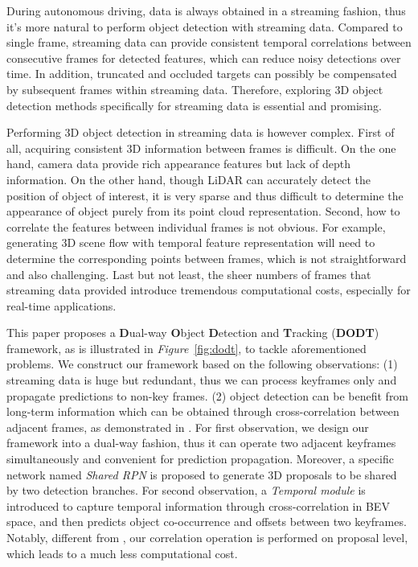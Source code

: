 \documentclass[a4paper, 10pt, conference]{ieeeconf}      %
\def\figurename{\emph{Figure}}
\begin{document}
During autonomous driving, data is always obtained in a streaming fashion, thus it's more natural to perform object detection with streaming data. Compared to single frame, streaming data can provide consistent temporal correlations between consecutive frames for detected features, which can reduce noisy detections over time. In addition, truncated and occluded targets can possibly be compensated by subsequent frames within streaming data. Therefore, exploring 3D object detection methods specifically for streaming data is essential and promising.

Performing 3D object detection in streaming data is however complex. First of all, acquiring consistent 3D information between frames is difficult. On the one hand, camera data provide rich appearance features but lack of depth information. On the other hand, though LiDAR can accurately detect the position of object of interest, it is very sparse and thus difficult to determine the appearance of object purely from its point cloud representation. Second, how to correlate the features between individual frames is not obvious. For example, generating 3D scene flow with temporal feature representation will need to determine the corresponding points between frames, which is not straightforward and also challenging. Last but not least, the sheer numbers of frames that streaming data provided introduce tremendous computational costs, especially for real-time applications. 

This paper proposes a \textbf{D}ual-way \textbf{O}bject \textbf{D}etection and \textbf{T}racking (\textbf{DODT}) framework, as is illustrated in \figurename \, \ref{fig:dodt}, to tackle aforementioned problems. We construct our framework based on the following observations: (1) streaming data is huge but redundant, thus we can process keyframes only and propagate predictions to non-key frames. (2) object detection can be benefit from long-term information which can be obtained through cross-correlation between adjacent frames, as demonstrated in \cite{feichtenhofer2017detect}. For first observation, we design our framework into a dual-way fashion, thus it can operate two adjacent keyframes simultaneously and convenient for prediction propagation. Moreover, a specific network named \textit{Shared RPN} is proposed to generate 3D proposals to be shared by two detection branches. For second observation, a \textit{Temporal module} is introduced to capture temporal information through cross-correlation in BEV space, and then predicts object co-occurrence and offsets between two keyframes. Notably, different from \cite{feichtenhofer2017detect, dosovitskiy2015flownet},  our correlation operation is performed on proposal level, which leads to a much less computational cost. 
\end{document}
